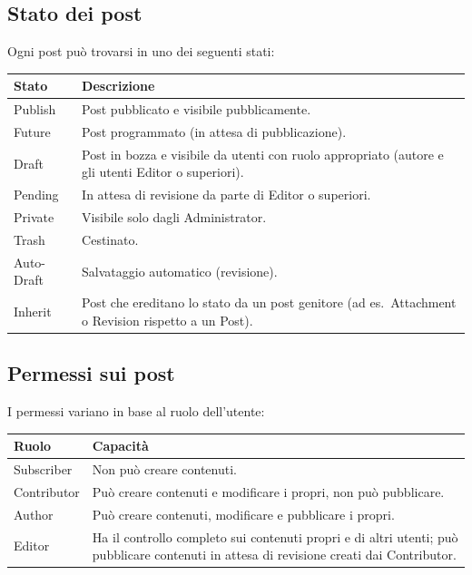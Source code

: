 \subsection{Stato dei post}

Ogni post può trovarsi in uno dei seguenti stati:

\begin{center}
\begin{tabular}{|l|p{9cm}|}
\hline
\textbf{Stato} & \textbf{Descrizione} \\
\hline
Publish & Post pubblicato e visibile pubblicamente. \\
\hline
Future & Post programmato (in attesa di pubblicazione). \\
\hline
Draft & Post in bozza e visibile da utenti con ruolo appropriato (autore e gli utenti Editor o superiori). \\
\hline
Pending & In attesa di revisione da parte di Editor o superiori. \\
\hline
Private & Visibile solo dagli Administrator. \\
\hline
Trash & Cestinato. \\
\hline
Auto-Draft & Salvataggio automatico (revisione). \\
\hline
Inherit & Post che ereditano lo stato da un post genitore (ad es.\ Attachment o Revision rispetto a un Post). \\
\hline
\end{tabular}
\end{center}

\subsection{Permessi sui post}

I permessi variano in base al ruolo dell'utente:

\begin{center}
\begin{tabular}{|l|p{9cm}|}
\hline
\textbf{Ruolo} & \textbf{Capacità} \\
\hline
Subscriber & Non può creare contenuti. \\
\hline
Contributor & Può creare contenuti e modificare i propri, non può pubblicare. \\
\hline
Author & Può creare contenuti, modificare e pubblicare i propri. \\
\hline
Editor & Ha il controllo completo sui contenuti propri e di altri utenti; può pubblicare contenuti in attesa di revisione creati dai Contributor. \\
\hline
\end{tabular}
\end{center}

